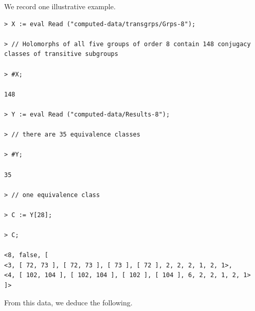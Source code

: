 \documentclass[a4paper,11pt]{article}
\begin{document}
	We record one illustrative example.
	
	\begin{lstlisting}
> X := eval Read ("computed-data/transgrps/Grps-8");

> // Holomorphs of all five groups of order 8 contain 148 conjugacy classes of transitive subgroups

> #X;

148

> Y := eval Read ("computed-data/Results-8");

> // there are 35 equivalence classes

> #Y;

35

> // one equivalence class

> C := Y[28];

> C;

<8, false, [
<3, [ 72, 73 ], [ 72, 73 ], [ 73 ], [ 72 ], 2, 2, 2, 1, 2, 1>,
<4, [ 102, 104 ], [ 102, 104 ], [ 102 ], [ 104 ], 6, 2, 2, 1, 2, 1>
]>
\end{lstlisting}
	From this data, we deduce the following.
	
\end{document}
